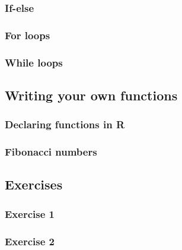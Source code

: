 \documentclass[]{gitbook}
\begin{document}
\hypertarget{if-else}{%
\subsubsection{If-else}\label{if-else}}

\hypertarget{for-loops}{%
\subsubsection{For loops}\label{for-loops}}

\hypertarget{while-loops}{%
\subsubsection{While loops}\label{while-loops}}

\hypertarget{writing-your-own-functions}{%
\subsection{Writing your own functions}\label{writing-your-own-functions}}

\hypertarget{declaring-functions-in-r}{%
\subsubsection{Declaring functions in R}\label{declaring-functions-in-r}}

\hypertarget{fibonacci-numbers}{%
\subsubsection{Fibonacci numbers}\label{fibonacci-numbers}}

\hypertarget{exercises-3}{%
\subsection{Exercises}\label{exercises-3}}

\hypertarget{exercise-1-3}{%
\subsubsection*{Exercise 1}\label{exercise-1-3}}

\hypertarget{exercise-2-1}{%
\subsubsection*{Exercise 2}\label{exercise-2-1}}
\end{document}
